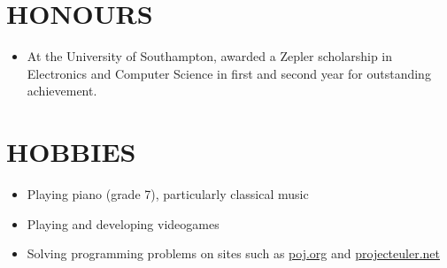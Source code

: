 \documentclass[margin]{res}
\begin{document}
\begin{resume}
\section{HONOURS}
	\begin{itemize}
	\item At the University of Southampton, awarded a Zepler scholarship in Electronics and Computer Science in first and second year for outstanding achievement.
	\end{itemize}

\section{HOBBIES}
	\begin{itemize}
	\item Playing piano (grade 7), particularly classical music
	\item Playing and developing videogames
	\item Solving programming problems on sites such as \href{http://poj.org/}{poj.org} and \href{https://projecteuler.net/}{projecteuler.net}
	\end{itemize}

\end{resume}
\end{document}
